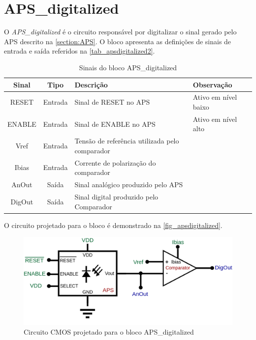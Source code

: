 \renewcommand{\NomeBloco}{APS\_digitalized}
\renewcommand{\NomeBlocoNoUnderline}{apsdigitalized}
\renewcommand{\NomePTab}{tab_\NomeBlocoNoUnderline}
\renewcommand{\NomeSTab}{tab_\NomeBlocoNoUnderline2}
\renewcommand{\NomePFig}{fig_\NomeBlocoNoUnderline}
\renewcommand{\NomeSFig}{fig_\NomeBlocoNoUnderline2}
\renewcommand{\NomeTTab}{tab_\NomeBlocoNoUnderline3}
\renewcommand{\NomeQTab}{tab_\NomeBlocoNoUnderline4}

\section{\NomeBloco}

O \emph{APS\_digitalized} \'e o circuito respons\'avel por digitalizar o sinal gerado pelo APS descrito na \autoref{section:APS}. O bloco apresenta as defini{\c c}\~oes de sinais de entrada e sa\'ida referidos na \autoref{\NomeSTab}.

\begin{table}[htbp]
\caption{Sinais do bloco \NomeBloco}
\label{\NomeSTab}
\centering
\begin{tabular}{ccll}

    \toprule
    Sinal & Tipo    & Descri{\c c}\~ao & Observa{\c c}\~ao        \\
    \midrule \midrule
    RESET   & Entrada   & Sinal de RESET no APS & Ativo em nível baixo\\
    \midrule
    ENABLE   & Entrada   & Sinal de ENABLE no APS & Ativo em nível alto\\
    \midrule
    Vref   & Entrada   & Tens\~ao de refer\^encia utilizada pelo comparador \\
    \midrule
    Ibias   & Entrada   & Corrente de polariza{\c c}\~ao do comparador \\
    \midrule
    AnOut   & Saída   & Sinal anal\'ogico produzido pelo APS \\
    \midrule
    DigOut   & Saída   & Sinal digital produzido pelo Comparador \\
    \bottomrule
\end{tabular}
\end{table}

O circuito projetado para o bloco \'e demonstrado na \autoref{\NomePFig}.

\begin{figure}[htb]
 \label{\NomePFig}
 \centering
    \centering
    \caption{Circuito CMOS projetado para o bloco \NomeBloco} 
    \includegraphics[scale=0.4]{Circuitos/APS_digitalized.png}
\end{figure}

